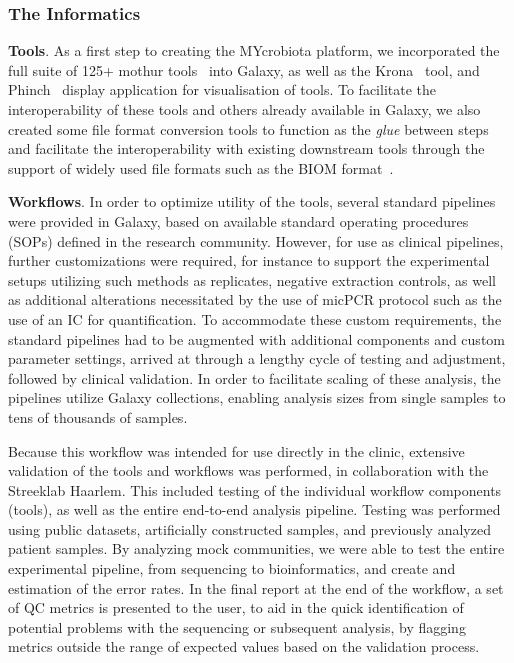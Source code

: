\subsubsection{The Informatics}

\textbf{Tools}. As a first step to creating the MYcrobiota platform, we incorporated the full suite of 125+ mothur tools~\cite{schloss} into Galaxy, as well as the Krona~\cite{ondov2015krona} tool, and Phinch~\cite{bik2014phinch} display application for visualisation of tools. To facilitate the interoperability of these tools and others already available in Galaxy, we also created some file format conversion tools to function as the \emph{glue} between steps and facilitate the interoperability with existing downstream tools through the support of widely used file formats such as the BIOM format~\cite{mcdonald2012biological}.


\textbf{Workflows}. In order to optimize utility of the tools, several standard pipelines were provided in Galaxy, based on available standard operating procedures (SOPs) defined in the research community. However, for use as clinical pipelines, further customizations were required, for instance to support the experimental setups utilizing such methods as replicates, negative extraction controls, as well as additional alterations necessitated by the use of micPCR protocol such as the use of an IC for quantification. To accommodate these custom requirements, the standard pipelines had to be augmented with additional components and custom parameter settings, arrived at through a lengthy cycle of testing and adjustment, followed by clinical validation. In order to facilitate scaling of these analysis, the pipelines utilize Galaxy collections, enabling analysis sizes from single samples to tens of thousands of samples.

Because this workflow was intended for use directly in the clinic, extensive validation of the tools and workflows was performed, in collaboration with the Streeklab Haarlem. This included testing of the individual workflow components (tools), as well as the entire end-to-end analysis pipeline. Testing was performed using public datasets, artificially constructed samples, and previously analyzed patient samples. By analyzing mock communities, we were able to test the entire experimental pipeline, from sequencing to bioinformatics, and create and estimation of the error rates. In the final report at the end of the workflow, a set of QC metrics is presented to the user, to aid in the quick identification of potential problems with the sequencing or subsequent analysis, by flagging metrics outside the range of expected values based on the validation process.


